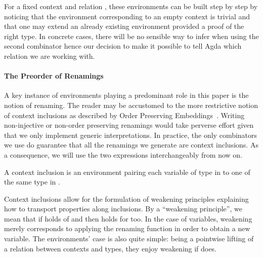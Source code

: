 
For a fixed context  and relation , these environments can
be built step by step by noticing that the environment corresponding to
an empty context is trivial and that one may extend an already existing
environment provided a proof of the right type. In concrete cases, there
will be no sensible way to infer  when using the second combinator
hence our decision to make it possible to tell Agda which relation we are
working with.

\noindent\begin{minipage}[t]{0.25\textwidth}
\end{minipage}
\begin{minipage}[t]{0.75\textwidth}
\end{minipage}

\paragraph{The Preorder of Renamings}\label{preorder}
A key instance of environments playing a predominant role in this paper
is the notion of renaming. The reader may be accustomed to the more
restrictive notion of context inclusions as described by Order Preserving
Embeddings~\cite{altenkirch1995categorical}. Writing non-injective or
non-order preserving renamings would take perverse effort given that we
only implement generic interpretations. In practice, the only combinators
we use do guarantee that all the renamings we generate are context inclusions.
As a consequence, we will use the two expressions interchangeably from now
on.

A context inclusion    is an environment pairing each
variable of type  in  to one of the same type in .


Context inclusions allow for the formulation of weakening principles
explaining how to transport properties along inclusions. By a ``weakening
principle'', we mean that if  holds of  and   
then  holds for  too.
In the case of variables, weakening merely corresponds to applying the
renaming function in order to obtain a new variable. The environments'
case is also quite simple: being a pointwise lifting of a relation 
between contexts and types, they enjoy weakening if  does.

